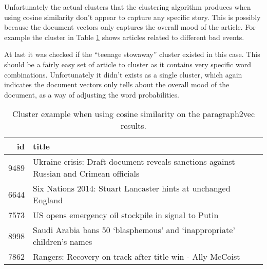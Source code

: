 Unfortunately the actual clusters that the clustering algorithm produces when using cosine similarity don't appear to capture any specific story. This is possibly because the document vectors only captures the overall mood of the article. For example the cluster in Table \ref{table:paragraph2vec:example} shows articles related to different bad events.

At last it was checked if the ``teenage stowaway'' cluster existed in this case. This should be a fairly easy set of article to cluster as it contains very specific word combinations. Unfortunately it didn't exists as a single cluster, which again indicates the document vectors only tells about the overall mood of the document, as a way of adjusting the word probabilities.

\begin{table}[H]
\centering
\begin{tabular}{r|p{10cm}}
id & title \\ \hline
  9489 & Ukraine crisis: Draft document reveals sanctions against Russian and Crimean officials \\
  6644 & Six Nations 2014: Stuart Lancaster hints at unchanged England \\
  7573 & US opens emergency oil stockpile in signal to Putin \\
  8998 & Saudi Arabia bans 50 ‘blasphemous’ and ‘inappropriate’ children’s names \\
  7862 & Rangers: Recovery on track after title win - Ally McCoist
\end{tabular}
\caption{Cluster example when using cosine similarity on the paragraph2vec results.}
\label{table:paragraph2vec:example}
\end{table}
